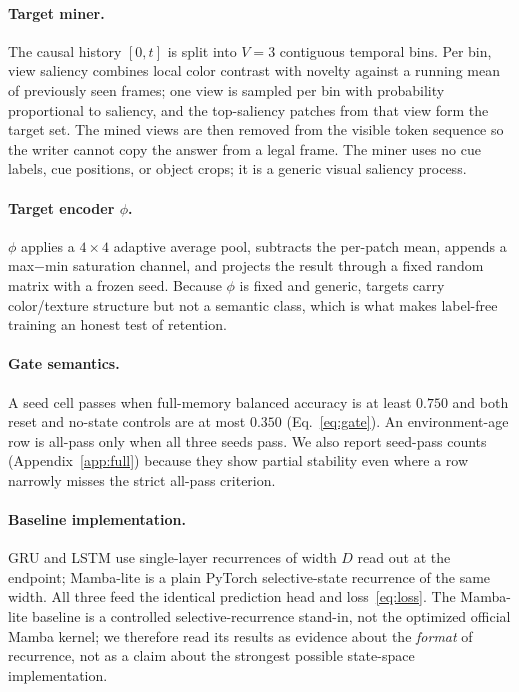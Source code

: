 \paragraph{Target miner.}
The causal history $[0,t]$ is split into $V{=}3$ contiguous temporal bins.  Per
bin, view saliency combines local color contrast with novelty against a running
mean of previously seen frames; one view is sampled per bin with probability
proportional to saliency, and the top-saliency patches from that view form the
target set.  The mined views are then removed from the visible token sequence so
the writer cannot copy the answer from a legal frame.  The miner uses no cue
labels, cue positions, or object crops; it is a generic visual saliency process.

\paragraph{Target encoder $\phi$.}
$\phi$ applies a $4{\times}4$ adaptive average pool, subtracts the per-patch
mean, appends a max$-$min saturation channel, and projects the result through a
fixed random matrix with a frozen seed.  Because $\phi$ is fixed and generic,
targets carry color/texture structure but not a semantic class, which is what
makes label-free training an honest test of retention.

\paragraph{Gate semantics.}
A seed cell passes when full-memory balanced accuracy is at least $0.750$ and
both reset and no-state controls are at most $0.350$ (Eq.~\eqref{eq:gate}).  An
environment-age row is all-pass only when all three seeds pass.  We also report
seed-pass counts (Appendix~\ref{app:full}) because they show partial stability
even where a row narrowly misses the strict all-pass criterion.

\paragraph{Baseline implementation.}
GRU and LSTM use single-layer recurrences of width $D$ read out at the endpoint;
Mamba-lite is a plain PyTorch selective-state recurrence of the same width.  All
three feed the identical prediction head and loss~\eqref{eq:loss}.  The
Mamba-lite baseline is a controlled selective-recurrence stand-in, not the
optimized official Mamba kernel; we therefore read its results as evidence about
the \emph{format} of recurrence, not as a claim about the strongest possible
state-space implementation.

